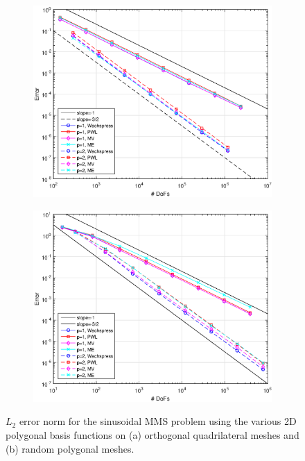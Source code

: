 \documentclass[11pt]{article}
\begin{document}
\begin{figure}[hbt]
\centering
	\begin{subfigure}[b]{0.495\textwidth}
		\centering
		\includegraphics[width=\textwidth]{figures/TransMMS_Sine_cart_err.eps}
		\caption{}
	\end{subfigure}
	\hfill
	\begin{subfigure}[b]{0.495\textwidth}
		\centering
		\includegraphics[width=\textwidth]{figures/TransMMS_Sine_poly_err.eps}
		\caption{}
	\end{subfigure}
\caption{$L_2$ error norm for the sinusoidal MMS problem using the various 2D polygonal basis functions on (a) orthogonal quadrilateral meshes and (b) random polygonal meshes.}
\label{fig::mms_err}
\end{figure}
\end{document}
